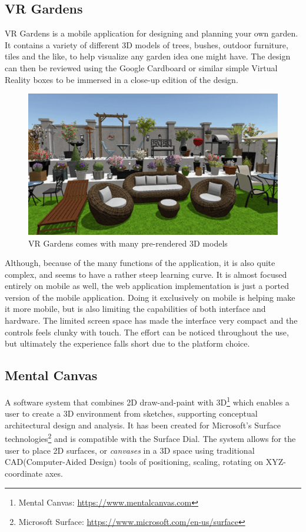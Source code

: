 		\subsection{VR Gardens}
			VR Gardens is a mobile application for designing and planning your own garden. It contains a variety of different 3D models of trees, bushes, outdoor furniture, tiles and the like, to help visualize any garden idea one might have. The design can then be reviewed using the Google Cardboard or similar simple Virtual Reality boxes to be immersed in a close-up edition of the design.
			\begin{figure}[H]
				\centering
				\includegraphics[width=0.6\linewidth]{figure/Analysis/vrgardens}
				\caption{VR Gardens comes with many pre-rendered 3D models}
				\label{fig:vrgardens}
			\end{figure}
			Although, because of the many functions of the application, it is also quite complex, and seems to have a rather steep learning curve. It is almost focused entirely on mobile as well, the web application implementation is just a ported version of the mobile application. Doing it exclusively on mobile is helping make it more mobile, but is also limiting the capabilities of both interface and hardware. The limited screen space has made the interface very compact and the controls feels clunky with touch. The effort can be noticed throughout the use, but ultimately the experience falls short due to the 	platform choice.
		\subsection{Mental Canvas}
			A software system that combines 2D draw-and-paint with 3D\footnote{Mental Canvas: \url{https://www.mentalcanvas.com}} which enables a user to create a 3D environment from sketches, supporting conceptual architectural design and analysis. It has been created for Microsoft's Surface technologies\footnote{Microsoft Surface: \url{https://www.microsoft.com/en-us/surface}} and is compatible with the Surface Dial. The system allows for the user to place 2D surfaces, or \textit{canvases} in a 3D space using traditional CAD(Computer-Aided Design) tools of positioning, scaling, rotating on XYZ-coordinate axes.\cite{sotaMentalCanvas}
			
